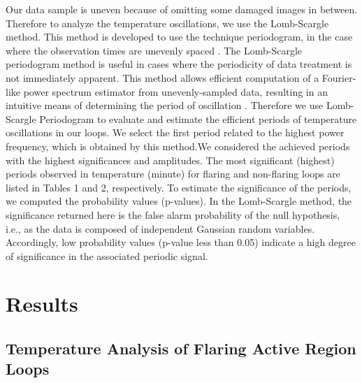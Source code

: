 \documentclass[oneside,onecolumn]{article}
\begin{document}
Our data sample is uneven because of omitting some damaged images in between. Therefore to analyze the temperature oscillations, we use the Lomb-Scargle method. This method is developed to use the technique periodogram, in the case where the observation times are unevenly spaced \citep{ref:Scargle1982}. The Lomb-Scargle periodogram method is useful in cases where the periodicity of data treatment is not immediately apparent. This method allows efficient computation of a Fourier-like power spectrum estimator from unevenly-sampled data, resulting in an intuitive means of determining the period of oscillation \citep{ref:VanderPlas2018}. Therefore we use Lomb-Scargle Periodogram to evaluate and estimate the efficient periods of temperature oscillations in our loops. We select the first period related to the highest power frequency, which is obtained by this method.We considered the achieved periods with the highest significances and amplitudes. The most significant (highest) periods observed in temperature (minute) for flaring and non-flaring loops are listed in Tables 1 and 2, respectively. To estimate the significance of the periods, we computed the probability values (p-values). In the Lomb-Scargle method, the significance returned here is the false alarm probability of the null hypothesis, i.e., as the data is composed of independent Gaussian random variables. Accordingly, low probability values (p-value less than 0.05) indicate a high degree of significance in the associated periodic signal. 

\section{Results}
\label{sec:R}
\subsection{Temperature Analysis of Flaring Active Region Loops}
\end{document}
